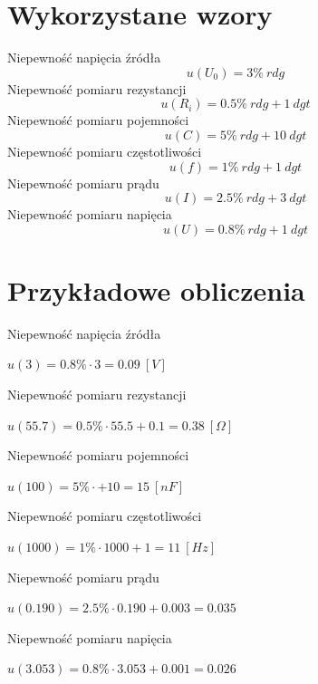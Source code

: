 \documentclass[12pt, a4paper, oneside]{article}
\begin{document}
\section{Wykorzystane wzory}
Niepewność napięcia źródła
\begin{equation}
u(U_0) = 3\%~rdg
\end{equation}
Niepewność pomiaru rezystancji
\begin{equation}
u(R_i) = 0.5\%~rdg + 1~dgt
\end{equation}
Niepewność pomiaru pojemności
\begin{equation}
u(C) = 5\%~rdg + 10~dgt
\end{equation}
Niepewność pomiaru częstotliwości
\begin{equation}
u(f) = 1\%~rdg + 1~dgt
\end{equation}
Niepewność pomiaru prądu
\begin{equation}
u(I) = 2.5\%~rdg + 3~dgt
\end{equation}
Niepewność pomiaru napięcia
\begin{equation}
u(U) = 0.8\%~rdg + 1~dgt
\end{equation}
\section{Przykładowe obliczenia}
Niepewność napięcia źródła
\begin{center}
$u(3) = 0.8\%\cdot3=0.09~[V]$
\end{center}
Niepewność pomiaru rezystancji
\begin{center}
$u(55.7) = 0.5\%\cdot55.5+0.1=0.38~[\Omega]$
\end{center}
Niepewność pomiaru pojemności
\begin{center}
$u(100) = 5\%\cdot + 10=15~[nF]$
\end{center}
Niepewność pomiaru częstotliwości
\begin{center}
$u(1000) = 1\%\cdot 1000 + 1 = 11~[Hz]$
\end{center}
Niepewność pomiaru prądu
\begin{center}
$u(0.190) = 2.5\%\cdot 0.190 + 0.003=0.035$
\end{center}
Niepewność pomiaru napięcia
\begin{center}
$u(3.053) = 0.8\%\cdot3.053+0.001=0.026$
\end{center}
\clearpage
\end{document}
